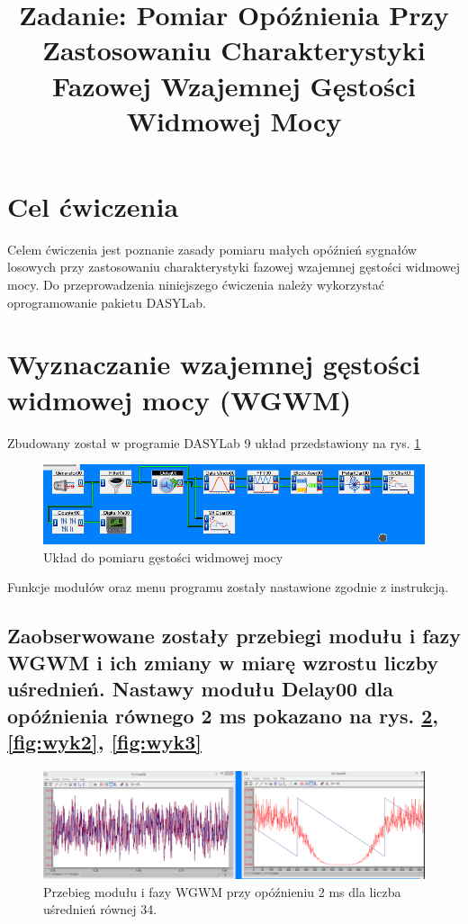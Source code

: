 \documentclass{classrep}
\author{  \studentinfo{Witold Olechowski}{127517} 	\and
		  \studentinfo{Grzegorz Pelczar}{125242} 	\and
		  \studentinfo{Tomasz Marecik}{127374} 		}
\title{\textbf{Zadanie:} Pomiar Opóźnienia Przy Zastosowaniu Charakterystyki Fazowej Wzajemnej Gęstości Widmowej Mocy }
\begin{document}
\maketitle

\section{Cel ćwiczenia}
\quad Celem ćwiczenia jest poznanie zasady pomiaru małych opóźnień sygnałów losowych przy zastosowaniu charakterystyki fazowej wzajemnej gęstości widmowej mocy. Do przeprowadzenia niniejszego ćwiczenia należy wykorzystać oprogramowanie pakietu DASYLab. 

\section{Wyznaczanie wzajemnej gęstości widmowej mocy (WGWM)}
\quad Zbudowany został w programie DASYLab 9 układ przedstawiony na rys. \ref{fig:sch1}

\begin{figure}[H]
\centering
\includegraphics[width=0.8\linewidth]{sch1}
\caption{Układ do pomiaru gęstości widmowej mocy}
\label{fig:sch1}
\end{figure}

Funkcje modułów oraz menu programu zostały nastawione zgodnie z instrukcją. 

\subsection{Zaobserwowane zostały przebiegi modułu i fazy WGWM i ich zmiany w miarę wzrostu liczby uśrednień. Nastawy modułu Delay00 dla opóźnienia równego 2 ms pokazano na rys. \ref{fig:wyk1}, \ref{fig:wyk2}, \ref{fig:wyk3}  }

\begin{figure}[H]
\centering
\includegraphics[width=1\linewidth]{wyk1}
\caption{Przebieg modułu i fazy WGWM przy opóźnieniu 2 ms dla liczba uśrednień równej 34.}
\label{fig:wyk1}
\end{figure}
\end{document}
